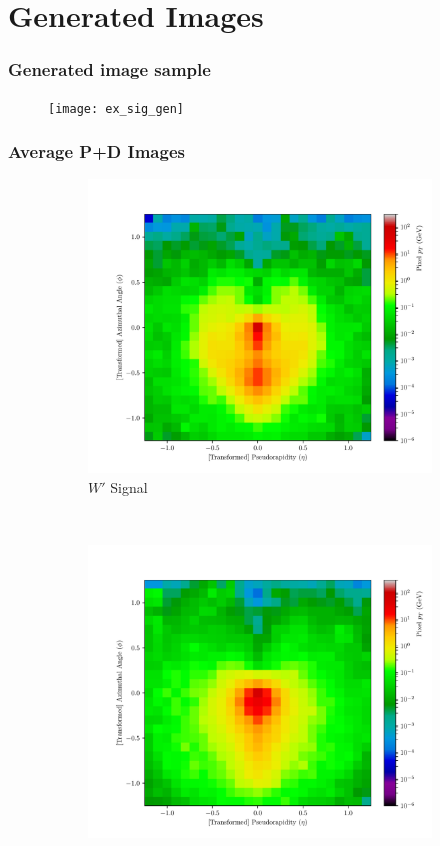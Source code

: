 \documentclass{beamer}
\begin{document}
	
	\section{Generated Images}
	\label{sec:results}
	\begin{frame}
		\frametitle{Generated image sample}
		\begin{figure}[H]
			\centering
			\texttt{[image: ex\_sig\_gen]}
			
		\end{figure}
	\end{frame}
	
	\begin{frame}
		\frametitle{Average P+D Images}
		\begin{figure}[H]
			\centering
			\begin{subfigure}[t]{0.5\linewidth}
				\centering
				\includegraphics[width=1.0\linewidth]{av_sig_real_24k}
				\caption{$W'$ Signal}
			\end{subfigure}%
			~ 
			\begin{subfigure}[t]{0.5\linewidth}
				\centering
				\includegraphics[width=1.0\linewidth]{av_noise_real_24k}

\end{subfigure}
\end{figure}
\end{frame}
\end{document}
